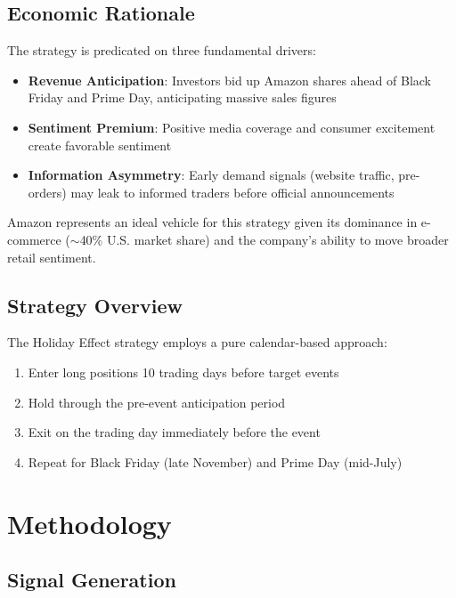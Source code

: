 \documentclass[twocolumn,ieee]{arithmaxresearch}
\begin{document}
\subsection{Economic Rationale}

The strategy is predicated on three fundamental drivers:

\begin{itemize}
    \item \textbf{Revenue Anticipation}: Investors bid up Amazon shares ahead of Black Friday and Prime Day, anticipating massive sales figures
    \item \textbf{Sentiment Premium}: Positive media coverage and consumer excitement create favorable sentiment
    \item \textbf{Information Asymmetry}: Early demand signals (website traffic, pre-orders) may leak to informed traders before official announcements
\end{itemize}

Amazon represents an ideal vehicle for this strategy given its dominance in e-commerce ($\sim$40\% U.S. market share) and the company's ability to move broader retail sentiment.

\subsection{Strategy Overview}

The Holiday Effect strategy employs a pure calendar-based approach:

\begin{enumerate}
    \item Enter long positions 10 trading days before target events
    \item Hold through the pre-event anticipation period
    \item Exit on the trading day immediately before the event
    \item Repeat for Black Friday (late November) and Prime Day (mid-July)
\end{enumerate}

\section{Methodology}

\subsection{Signal Generation}
\end{document}
